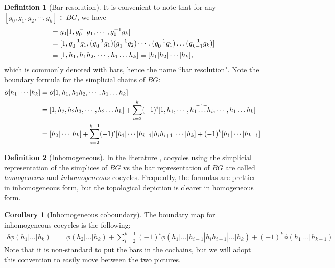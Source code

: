 \documentclass{article}
\theoremstyle{definition}
\newtheorem{defn}{Definition}
\theoremstyle{definition}
\newtheorem{cor}{Corollary}
\begin{document}
\begin{defn}[Bar resolution]\label{defn:bar-resolution}
It is convenient to note that for any $[g_0, g_1, g_2, \cdots, g_k] \in BG$, we have
\begin{align}
[g_0, g_1, g_2, \cdots, g_k] &= g_0[1, g_0^{-1}g_1, \cdots, g_0^{-1}g_k]\notag\\
&= [1, g_0^{-1}g_1, (g_0^{-1}g_1) (g_1^{-1}g_2) \cdots, (g_0^{-1}g_1) \ldots (g_{k-1}^{-1}g_k)] \notag \\
&\equiv [1, h_1, h_1h_2,\cdots, h_1\ldots h_k]\equiv [h_1 | h_2 | \cdots | h_k],
\end{align}
which is commonly denoted with bars, hence the name ``bar resolution". Note the boundary formula for the simplicial chains of $BG$:
\begin{align}
\partial [h_1 | \cdots | h_k]  &= \partial [1, h_1, h_1h_2, \cdots, h_1\ldots h_k] \notag \\
&= [1, h_2, h_2h_3, \cdots, h_2 \ldots h_k] + \sum_{i=2}^k(-1)^{i} [1, h_1, \cdots, \widehat{h_1 \ldots h_i}, \cdots, h_1 \ldots h_k] \notag \\
&= [h_2 | \cdots | h_k] + \sum_{i=2}^{k-1}(-1)^{i} [ h_1 | \cdots| h_{i-1} | h_ih_{i+1} | \cdots | h_k] + (-1)^k[h_1 | \cdots | h_{k-1}]
\end{align}
\end{defn}

\begin{defn}[Inhomogeneous]\label{defn:inhomogeneous-cocycles}
In the literature \cite{SPT_cohomology}, cocycles using the simplicial representation of the simplices of $BG$ vs the bar representation of $BG$ are called \textit{homogeneous} and $\textit{inhomogeneous}$ cocycles. Frequently, the formulas are prettier in inhomogeneous form, but the topological depiction is clearer in homogeneous form.
\end{defn}

\begin{cor}[Inhomogeneous coboundary]\label{cor:inhomogeneous-coboundary-formula}
The boundary map for inhomogeneous cocycles is the following:
\begin{align}
\delta \phi(h_1| \dots| h_k) 
&= \phi(h_2| \dots| h_k) + \sum_{i=2}^{k-1}(-1)^i\phi(h_1| \dots| h_{i-1}|h_ih_{i+1}| \dots| h_k) + (-1)^k\phi(h_1| \dots| h_{k-1})
\end{align}
Note that it is non-standard to put the bars in the cochains, but we will adopt this convention to easily move between the two pictures.
\end{cor}
\end{document}
